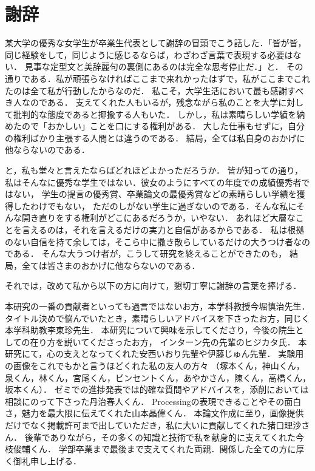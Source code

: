 \chapter{謝辞}
\label{chp:thanks}
某大学の優秀な女学生が卒業生代表として謝辞の冒頭でこう話した．「皆が皆，同じ経験をして，同じように感じるならば，わざわざ言葉で表現する必要はない．
見事な定型文と美辞麗句の裏側にあるのは完全な思考停止だ．」と．
その通りである．私が頑張らなければここまで来れかったはずで，私がここまでこれたのは全て私が行動したからなのだ．
私こそ，大学生活において最も感謝すべき人なのである．
支えてくれた人もいるが，残念ながら私のことを大学に対して批判的な態度であると揶揄する人もいた．
しかし，私は素晴らしい学績を納めたので「おかしい」ことを口にする権利がある．
大した仕事もせずに，自分の権利ばかり主張する人間とは違うのである．
結局，全ては私自身のおかげに他ならないのである．

と，私も堂々と言えたならばどれほどよかっただろうか．
皆が知っての通り，私はそんなに優秀な学生ではない．彼女のようにすべての年度での成績優秀者ではない，
学生の提言の優秀賞、卒業論文の最優秀賞などの素晴らしい学績を獲得したわけでもない，
ただのしがない学生に過ぎないのである．そんな私にそんな開き直りをする権利がどこにあるだろうか，いやない．
あれほど大層なことを言えるのは，それを言えるだけの実力と自信があるからである．
私は根拠のない自信を持て余しては，そこら中に撒き散らしているだけの大うつけ者なのである．
そんな大うつけ者が，こうして研究を終えることができたのも，
結局，全ては皆さまのおかげに他ならないのである．

それでは，改めて私から以下の方に向けて，懇切丁寧に謝辞の言葉を捧げる．

本研究の一番の貢献者といっても過言ではないお方，本学科教授今堀慎治先生．
タイトル決めで悩んでいたとき，素晴らしいアドバイスを下さったお方，同じく本学科助教李東珍先生．
本研究について興味を示してくださり，今後の院生としての在り方を説いてくださったお方，
インターン先の先輩のヒジカタ氏．
本研究にて，心の支えとなってくれた安西いおり先輩や伊藤じゅん先輩．
実験用の画像をこれでもかと言うほどくれた私の友人の方々
（塚本くん，神山くん，泉くん，林くん，宮尾くん，ビンセントくん，あやかさん，陳くん，高橋くん，坂本くん）．
ゼミでの進捗発表では的確な質問やアドバイスを，添削においては相談にのって下さった丹治春人くん．
Processingの表現できることやその面白さ，魅力を最大限に伝えてくれた山本晶偉くん．
本論文作成に至り，画像提供だけでなく掲載許可まで出していただき，私に大いに貢献してくれた猪口理沙さん．
後輩でありながら，その多くの知識と技術で私を献身的に支えてくれた今枝俊輔くん．
学部卒業まで最後まで支えてくれた両親．関係した全ての方に厚く御礼申し上げる．